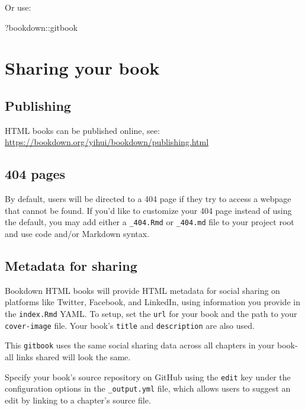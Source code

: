 \documentclass[
]{book}
\newenvironment{Shaded}{\begin{snugshade}}{\end{snugshade}}
\newcommand{\NormalTok}[1]{#1}
\newcommand{\SpecialCharTok}[1]{\textcolor[rgb]{0.00,0.00,0.00}{#1}}
\begin{document}
Or use:

\begin{Shaded}
\begin{Highlighting}[]
\NormalTok{?bookdown}\SpecialCharTok{::}\NormalTok{gitbook}
\end{Highlighting}
\end{Shaded}

\hypertarget{sharing-your-book-3}{%
\chapter{Sharing your book}\label{sharing-your-book-3}}

\hypertarget{publishing-5}{%
\section{Publishing}\label{publishing-5}}

HTML books can be published online, see: \url{https://bookdown.org/yihui/bookdown/publishing.html}

\hypertarget{pages-5}{%
\section{404 pages}\label{pages-5}}

By default, users will be directed to a 404 page if they try to access a webpage that cannot be found. If you'd like to customize your 404 page instead of using the default, you may add either a \texttt{\_404.Rmd} or \texttt{\_404.md} file to your project root and use code and/or Markdown syntax.

\hypertarget{metadata-for-sharing-5}{%
\section{Metadata for sharing}\label{metadata-for-sharing-5}}

Bookdown HTML books will provide HTML metadata for social sharing on platforms like Twitter, Facebook, and LinkedIn, using information you provide in the \texttt{index.Rmd} YAML. To setup, set the \texttt{url} for your book and the path to your \texttt{cover-image} file. Your book's \texttt{title} and \texttt{description} are also used.

This \texttt{gitbook} uses the same social sharing data across all chapters in your book- all links shared will look the same.

Specify your book's source repository on GitHub using the \texttt{edit} key under the configuration options in the \texttt{\_output.yml} file, which allows users to suggest an edit by linking to a chapter's source file.
\end{document}
